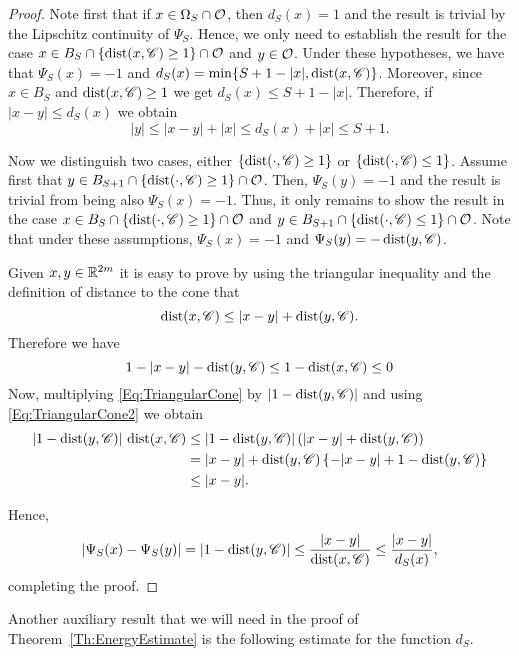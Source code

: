 \begin{proof}
Note first that if $x\in \Omega_S \cap \mathcal{O}$, then $d_S(x)=1$ and the result is trivial by the Lipschitz continuity of $\Psi_S$. Hence, we only need to establish the result for the case $x\in B_S\cap \{\operatorname{dist}(x,\mathscr{C})\geq 1\} \cap \mathcal{O}$ and $y\in \mathcal{O}$. Under these hypotheses, we have that $\Psi_S(x)=-1$ and $d_S(x) = \min\{S+1-|x|,\operatorname{dist}(x,\mathscr{C})\}$. Moreover, since $x\in B_S$ and $\operatorname{dist}(x,\mathscr{C})\geq 1$ we get $d_S(x) \leq S+1-|x|$. Therefore, if $|x-y|\leq d_S(x)$ we obtain
$$ |y|\leq |x-y| + |x| \leq d_S(x)+|x| \leq S+1. $$

Now we distinguish two cases, either $\{\operatorname{dist}(\cdot,\mathscr{C})\geq 1\}$ or $\{\operatorname{dist}(\cdot,\mathscr{C})\leq 1\}$. Assume first that $y\in B_{S+1} \cap \{\operatorname{dist}(\cdot,\mathscr{C})\geq 1\}\cap \mathcal{O}$. Then, $\Psi_S(y)=-1$ and the result is trivial from being also $\Psi_S(x)=-1$. Thus, it only remains to show the result in the case $x\in B_S \cap \{\operatorname{dist}(\cdot,\mathscr{C})\geq 1\}\cap \mathcal{O}$ and $y\in B_{S+1} \cap \{\operatorname{dist}(\cdot,\mathscr{C})\leq 1\}\cap \mathcal{O}$. Note that under these assumptions, $\Psi_S(x)=-1$ and $\Psi_S(y)=-\operatorname{dist}(y,\mathscr{C})$.


Given $x,y \in \mathbb{R}^{2m}$ it is easy to prove by using the triangular inequality and the definition of distance to the cone that
\begin{equation} \label{Eq:TriangularCone}
\operatorname{dist}(x,\mathscr{C}) \leq |x-y| + \operatorname{dist}(y,\mathscr{C}).
\end{equation}
Therefore we have
\begin{equation} \label{Eq:TriangularCone2}
1-|x-y|-\operatorname{dist}(y,\mathscr{C}) \leq 1-\operatorname{dist}(x,\mathscr{C}) \leq 0
\end{equation}
Now, multiplying \eqref{Eq:TriangularCone} by $|1-\operatorname{dist}(y,\mathscr{C})|$ and using \eqref{Eq:TriangularCone2} we obtain
\begin{align*}
|1-\operatorname{dist}(y,\mathscr{C})|\,\operatorname{dist}(x,\mathscr{C}) &\leq |1-\operatorname{dist}(y,\mathscr{C})| \left(|x-y| + \operatorname{dist}(y,\mathscr{C})\right) \\
&= |x-y|+\operatorname{dist}(y,\mathscr{C}) \left\{ -|x-y|+ 1- \operatorname{dist}(y,\mathscr{C}) \right\} \\
&\leq |x-y|.
\end{align*}

Hence,
$$ |\Psi_S(x)-\Psi_S(y)| = |1-\operatorname{dist}(y,\mathscr{C})| \leq \frac{|x-y|}{\operatorname{dist}(x,\mathscr{C})} \leq  \frac{|x-y|}{d_S(x)},$$
completing the proof.
\end{proof}

Another auxiliary result that we will need in the proof of Theorem~\ref{Th:EnergyEstimate} is the following estimate for the function $d_S$. 

